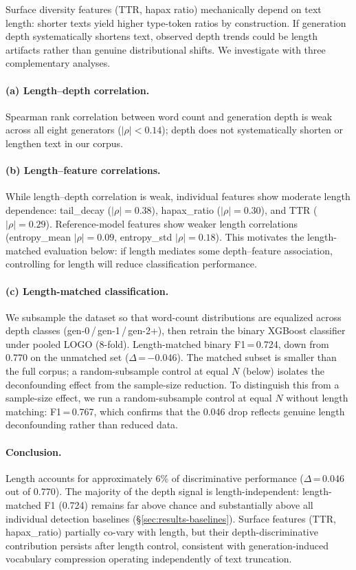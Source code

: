 
Surface diversity features (TTR, hapax ratio) mechanically depend on text length:
shorter texts yield higher type-token ratios by construction.
If generation depth systematically shortens text, observed depth trends could be length artifacts rather than genuine distributional shifts.
We investigate with three complementary analyses.

\paragraph{(a) Length--depth correlation.}
Spearman rank correlation between word count and generation depth is weak across all eight generators ($|\rho| < 0.14$); depth does not systematically shorten or lengthen text in our corpus.

\paragraph{(b) Length--feature correlations.}
While length--depth correlation is weak, individual features show moderate length dependence:
tail\_decay ($|\rho| = 0.38$), hapax\_ratio ($|\rho| = 0.30$), and TTR ($|\rho| = 0.29$).
Reference-model features show weaker length correlations (entropy\_mean $|\rho| = 0.09$, entropy\_std $|\rho| = 0.18$).
This motivates the length-matched evaluation below: if length mediates some depth--feature association, controlling for length will reduce classification performance.

\paragraph{(c) Length-matched classification.}
We subsample the dataset so that word-count distributions are equalized across depth classes (gen-0\,/\,gen-1\,/\,gen-2+), then retrain the binary XGBoost classifier under pooled LOGO (8-fold).
Length-matched binary F1\,=\,0.724, down from 0.770 on the unmatched set ($\Delta$\,=\,$-$0.046).
The matched subset is smaller than the full corpus; a random-subsample control at equal $N$ (below) isolates the deconfounding effect from the sample-size reduction.
To distinguish this from a sample-size effect, we run a random-subsample control at equal $N$ without length matching: F1\,=\,0.767, which confirms that the 0.046 drop reflects genuine length deconfounding rather than reduced data.

\paragraph{Conclusion.}
Length accounts for approximately 6\% of discriminative performance ($\Delta$\,=\,0.046 out of 0.770).
The majority of the depth signal is length-independent: length-matched F1 (0.724) remains far above chance and substantially above all individual detection baselines (\S\ref{sec:results-baselines}).
Surface features (TTR, hapax\_ratio) partially co-vary with length, but their depth-discriminative contribution persists after length control, consistent with generation-induced vocabulary compression operating independently of text truncation.
